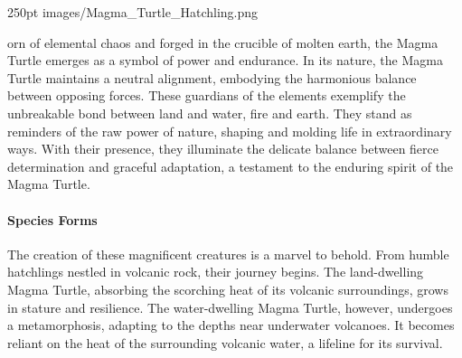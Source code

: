 \documentclass[letterpaper,openany,twoside,twocolumn]{book}
\begin{document}

\MonsterSheetGeometry

\mainmatter%


\MonsterFooterGraphic{0pt}%
	{250pt}%
	{images/Magma_Turtle_Hatchling.png}%
	{}%
	

\vspace*{-1.2\fontdimen6\font}

\entryfont \noindent {}orn of elemental chaos and forged in the crucible of molten earth, the Magma Turtle emerges as a symbol of power and endurance. In its nature, the Magma Turtle maintains a neutral alignment, embodying the harmonious balance between opposing forces. These guardians of the elements exemplify the unbreakable bond between land and water, fire and earth. They stand as reminders of the raw power of nature, shaping and molding life in extraordinary ways. With their presence, they illuminate the delicate balance between fierce determination and graceful adaptation, a testament to the enduring spirit of the Magma Turtle. \\

\paragraph{Species Forms} The creation of these magnificent creatures is a marvel to behold. From humble hatchlings nestled in volcanic rock, their journey begins. The land-dwelling Magma Turtle, absorbing the scorching heat of its volcanic surroundings, grows in stature and resilience. The water-dwelling Magma Turtle, however, undergoes a metamorphosis, adapting to the depths near underwater volcanoes. It becomes reliant on the heat of the surrounding volcanic water, a lifeline for its survival.
\end{document}
